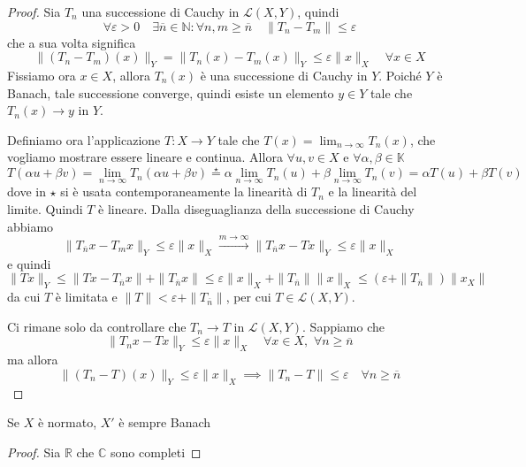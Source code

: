 \begin{proof}
    Sia \(T_{n}\) una successione di Cauchy in \(\mathcal{L}{(X, Y)}\), quindi
    \[
        \forall \varepsilon > 0 \quad \exists \overline{n} \in \mathbb{N} :
        \forall n ,m \ge \overline{n} \quad \|T_{n} - T_{m}\| \le \varepsilon
    \]
    che a sua volta significa
    \[
        \|(T_{n} - T_{m}){(x)}\|_Y = \|T_{n}{(x)} - T_{m}{(x)}\|_Y \le
        \varepsilon \|x\|_X \quad \forall x \in X
    \]
    Fissiamo ora \(x \in X\), allora \(T_{n}{(x)}\) è una successione di Cauchy
    in \(Y\). Poiché \(Y\) è Banach, tale successione converge, quindi esiste un
    elemento \(y \in Y\) tale che \(T_{n}{(x)} \to y\) in \(Y\). 

    Definiamo ora l'applicazione \(T : X \to Y\) tale che \(T{(x)} = \lim_{n \to
    \infty} T_{n}{(x)}\), che vogliamo mostrare essere lineare e continua.
    Allora \(\forall u,v \in X\) e \(\forall \alpha, \beta \in \mathbb{K}\) 
    \[
        T{(\alpha u + \beta v)} = \lim_{n \to \infty} T_{n}{(\alpha u + \beta
        v)} \overset{\star}{=} \alpha \lim_{n \to \infty} T_{n}{(u)} + \beta \lim_{n \to \infty}
        T_{n}{(v)} = \alpha T{(u)} + \beta T{(v)} 
    \]
    dove in \(\star\) si è usata contemporaneamente la linearità di \(T_{n}\) e
    la linearità del limite. Quindi \(T\) è lineare.
    Dalla diseguaglianza della successione di Cauchy abbiamo
    \[
        \|T_{\overline{n}} x - T_{m}x\|_Y \le \varepsilon\|x\|_X
        \overset{m \to \infty}{\longrightarrow} \|T_{\overline{n}} x - T x\|_Y
        \le \varepsilon \|x\|_X
    \]
    e quindi
    \[
        \|Tx\|_Y \le \|Tx - T_{\overline{n}}x\| + \|T_{\overline{n}}x\| \le
        \varepsilon \|x\|_X + \|T_{\overline{n}} \|\|x\|_X \le (\varepsilon +
        \|T_{\overline{n}} \|)\|x_X\|
    \]
    da cui \(T\) è limitata e \(\|T\|<\varepsilon + \|T_{\overline{n}} \|\), per
    cui \(T \in \mathcal{L}{(X, Y)}\).

    Ci rimane solo da controllare che \(T_{n} \to T\) in \(\mathcal{L}{(X,
    Y)}\). 
    Sappiamo che
    \[
        \|T_{n}x - Tx\|_Y \le \varepsilon\|x\|_X \quad \forall x \in X,\,\, \forall
        n \ge \overline{n}
    \]
    ma allora 
    \[
        \|{(T_{n} -T)}{(x)}\|_Y \le \varepsilon \|x\|_X \implies \|T_{n} - T\|
        \le \varepsilon \quad \forall n \ge \overline{n}
    \]
\end{proof}
\begin{corollary}
    Se \(X\) è normato, \(X'\) è sempre Banach
\end{corollary}
\begin{proof}
    Sia \(\mathbb{R}\) che \(\mathbb{C}\) sono completi
\end{proof}
